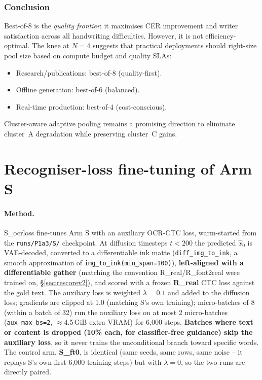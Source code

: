 \documentclass[10.5pt,a4paper]{article}
\newcommand{\fp}[1]{\nolinkurl{#1}}
\begin{document}
\subsubsection{Conclusion}

Best-of-8 is the \emph{quality frontier}: it maximises CER improvement and writer satisfaction across all handwriting
difficulties. However, it is not efficiency-optimal. The knee at $N{=}4$ suggests that practical deployments should right-size
pool size based on compute budget and quality SLAs:
\begin{itemize}
	\item Research/publications: best-of-8 (quality-first).
	\item Offline generation: best-of-6 (balanced).
	\item Real-time production: best-of-4 (cost-conscious).
\end{itemize}

Cluster-aware adaptive pooling remains a promising direction to eliminate cluster~A degradation while preserving cluster~C gains.

\section{Recogniser-loss fine-tuning of Arm S}
\label{sec:ocrloss}

\paragraph{Method.} S\_ocrloss fine-tunes Arm S with an auxiliary OCR-CTC loss, warm-started from the \fp{runs/P1a3/S/}
checkpoint. At diffusion timesteps $t<200$ the predicted $\hat x_0$ is VAE-decoded, converted to a differentiable ink matte
(\texttt{diff\_img\_to\_ink}, a smooth approximation of \texttt{img\_to\_ink(min\_span=100)}), \textbf{left-aligned with a
differentiable gather} (matching the convention R\_real/R\_font2real were trained on, \S\ref{sec:rescorev2}), and scored
with a frozen \textbf{R\_real} CTC loss against the gold text. The auxiliary loss is weighted $\lambda=0.1$ and added to the
diffusion loss; gradients are clipped at 1.0 (matching S's own training); micro-batches of 8 (within a batch of 32) run the
auxiliary loss on at most 2 micro-batches (\texttt{aux\_max\_bs=2}, $\approx$4.5\,GiB extra VRAM) for 6,000 steps.
\textbf{Batches where text or content is dropped (10\% each, for classifier-free guidance) skip the auxiliary loss}, so it
never trains the unconditional branch toward specific words. The control arm, \textbf{S\_ft0}, is identical (same seeds,
same rows, same noise -- it replays S's own first 6,000 training steps) but with $\lambda=0$, so the two runs are directly
paired.
\end{document}
